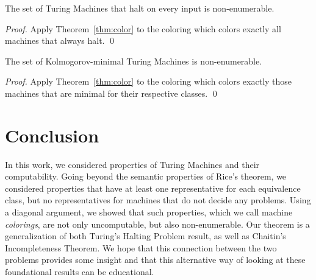 \documentclass[runningheads]{format/llncs}
\begin{document}
\begin{corollary}
    The set of Turing Machines that halt on every input is
    non-enumerable.
\end{corollary}
\begin{proof}
    Apply Theorem~\ref{thm:color}
    to the coloring which colors exactly all machines that
    always halt.
    \qed
\end{proof}

\begin{corollary}
    The set of Kolmogorov-minimal Turing Machines is
    non-enumerable.
\end{corollary}
\begin{proof}
    Apply Theorem~\ref{thm:color}
    to the coloring which colors exactly those machines
    that are minimal for their respective classes.
    \qed
\end{proof}

\section{Conclusion}
In this work, we considered properties of Turing Machines and
their computability. Going beyond the semantic properties of Rice's
theorem, we considered properties that have at least one
representative for each equivalence class, but no representatives
for machines that do not decide any problems. Using a diagonal
argument, we showed that such properties, which we call
machine \emph{colorings}, are not only uncomputable, but also
non-enumerable. Our theorem is a generalization of both Turing's
Halting Problem result, as well as Chaitin's Incompleteness Theorem.
We hope that this connection between the two problems provides some
insight and that this alternative way of looking at these
foundational results can be educational.



\end{document}
